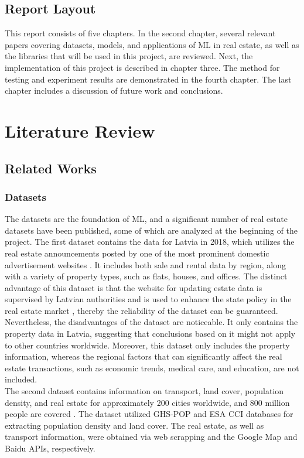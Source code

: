 \documentclass[12pt,twoside]{report}
\begin{document}
\section{Report Layout}
This report consists of five chapters. In the second chapter, several relevant papers covering datasets, models, and applications of ML in real estate, as well as the libraries that will be used in this project, are reviewed. Next, the implementation of this project is described in chapter three. The method for testing and experiment results are demonstrated in the fourth chapter. The last chapter includes a discussion of future work and conclusions. 

\chapter{Literature Review}
\section{Related Works} 
\subsection{Datasets}
The datasets are the foundation of ML, and a significant number of real estate datasets have been published, some of which are analyzed at the beginning of the project. The first dataset contains the data for Latvia in 2018, which utilizes the real estate announcements posted by one of the most prominent domestic advertisement websites \citep{RN22}. It includes both sale and rental data by region, along with a variety of property types, such as flats, houses, and offices. The distinct advantage of this dataset is that the website for updating estate data is supervised by Latvian authorities and is used to enhance the state policy in the real estate market \citep{RN22}, thereby the reliability of the dataset can be guaranteed.
\\

Nevertheless, the disadvantages of the dataset are noticeable. It only contains the property data in Latvia, suggesting that conclusions based on it might not apply to other countries worldwide. Moreover, this dataset only includes the property information, whereas the regional factors that can significantly affect the real estate transactions, such as economic trends, medical care, and education, are not included.
\\

The second dataset contains information on transport, land cover, population density, and real estate for approximately 200 cities worldwide, and 800 million people are covered \citep{RN26}. The dataset utilized GHS-POP and ESA CCI databases for extracting population density and land cover. The real estate, as well as transport information, were obtained via web scrapping and the Google Map and Baidu APIs, respectively.
\\ 
\end{document}
